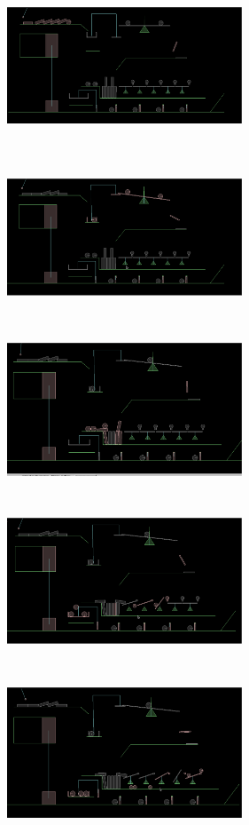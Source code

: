 \documentclass[a4paper,11pt]{article}
\begin{document}
\begin{center}
\includegraphics[width=70mm, height=50mm]{state_01.eps}
\includegraphics[width=70mm, height=50mm]{state_02.eps}\\
\includegraphics[width=70mm, height=50mm]{state_03.eps}
\includegraphics[width=70mm, height=50mm]{state_04.eps}\\
\includegraphics[width=70mm, height=50mm]{state_05.eps}

\end{center}
\end{document}
